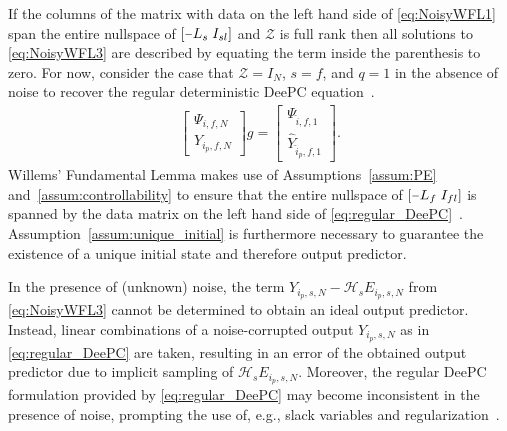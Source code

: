 If the columns of the matrix with data on the left hand side of \eqref{eq:NoisyWFL1} span the entire nullspace of $\left[\shortminus L_s\;I_{sl}\right]$ and $\mathcal{Z}$ is full rank then all solutions to \eqref{eq:NoisyWFL3} are described by equating the term inside the parenthesis to zero. For now, consider the case that $\mathcal{Z}=I_N$, $s=f$, and $q=1$ in the absence of noise to recover the regular deterministic \ac{DeePC} equation~\citep{Coulson2019}. %
\begin{align}\label{eq:regular_DeePC}
    \begin{bmatrix}
        \Psi_{i,f,N}\\
        Y_{i_p,f,N}
    \end{bmatrix}g=%
    \begin{bmatrix}
        \Psi_{\hat{i},f,1}\\
        \widehat{Y}_{\hat{i}_p,f,1}
    \end{bmatrix}.
\end{align}
Willems' Fundamental Lemma makes use of Assumptions~\ref{assum:PE} and~\ref{assum:controllability} to ensure that the entire nullspace of $\left[\shortminus L_f\;I_{fl}\right]$ is spanned by the data matrix on the left hand side of \eqref{eq:regular_DeePC}~\citep{Willems2005}. Assumption~\ref{assum:unique_initial} is furthermore necessary to guarantee the existence of a unique initial state and therefore output predictor. %

In the presence of (unknown) noise, the term $Y_{i_p,s,N}-\mathcal{H}_s E_{i_p,s,N}$ from \eqref{eq:NoisyWFL3} cannot be determined to obtain an ideal output predictor. Instead, linear combinations of a noise-corrupted output $Y_{i_p,s,N}$ as in \eqref{eq:regular_DeePC} are taken, resulting in an error of the obtained output predictor due to implicit sampling of $\mathcal{H}_s E_{i_p,s,N}$. Moreover, the regular \ac{DeePC} formulation provided by \eqref{eq:regular_DeePC} may become inconsistent in the presence of noise, prompting the use of, e.g., slack variables and regularization~\citep{Coulson2019}.
%
